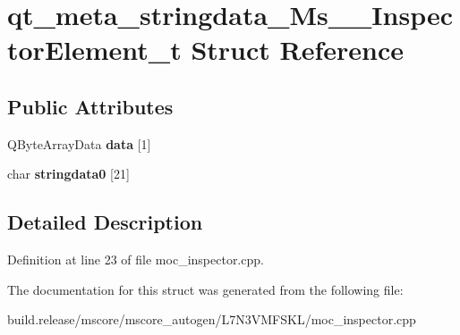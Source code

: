 \hypertarget{structqt__meta__stringdata___ms_____inspector_element__t}{}\section{qt\+\_\+meta\+\_\+stringdata\+\_\+\+Ms\+\_\+\+\_\+\+Inspector\+Element\+\_\+t Struct Reference}
\label{structqt__meta__stringdata___ms_____inspector_element__t}
\subsection*{Public Attributes}
\begin{DoxyCompactItemize}
\item 
\mbox{\label{structqt__meta__stringdata___ms_____inspector_element__t_a7cbd200d4b7b0882fa31ce671852d076}} 
Q\+Byte\+Array\+Data {\bfseries data} \mbox{[}1\mbox{]}
\item 
\mbox{\label{structqt__meta__stringdata___ms_____inspector_element__t_a54c1a892c285c6f294d285d4894715e7}} 
char {\bfseries stringdata0} \mbox{[}21\mbox{]}
\end{DoxyCompactItemize}


\subsection{Detailed Description}


Definition at line 23 of file moc\+\_\+inspector.\+cpp.



The documentation for this struct was generated from the following file\+:\begin{DoxyCompactItemize}
\item 
build.\+release/mscore/mscore\+\_\+autogen/\+L7\+N3\+V\+M\+F\+S\+K\+L/moc\+\_\+inspector.\+cpp\end{DoxyCompactItemize}
